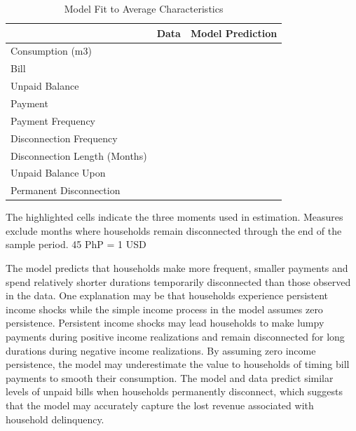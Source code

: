 \documentclass[12pt,table]{article}
\begin{document}
\begin{table}[H]
\centering
\caption{Model Fit to Average Characteristics}\label{table:fit}
\begin{threeparttable}
\begin{tabular}{@{}l*{1}{KK}@{}}
\toprule
 & Data & Model Prediction \\
\midrule
Consumption (m3) &  &   \\
Bill &   &   \\
Unpaid Balance &    &    \\
Payment &   &   \\
Payment Frequency &   &    \\
Disconnection Frequency &    &   \\
Disconnection Length (Months) &  &   \\
Unpaid Balance Upon &   &    \\[-.5em]
Permanent Disconnection \\
\bottomrule
\end{tabular}
\begin{tablenotes}
\item 
\footnotesize
The highlighted cells indicate the three moments used in estimation.  Measures exclude months where households remain disconnected through the end of the sample period.    45 PhP = 1 USD
\end{tablenotes}
\end{threeparttable}

\end{table}


The model predicts that households make more frequent, smaller payments and spend relatively shorter durations temporarily disconnected than those observed in the data.  One explanation may be that households experience persistent income shocks while the simple income process in the model assumes zero persistence.  Persistent income shocks may lead households to make lumpy payments during positive income realizations and remain disconnected for long durations during negative income realizations.  By assuming zero income persistence, the model may underestimate the value to households of timing bill payments to smooth their consumption.  The model and data predict similar levels of unpaid bills when households permanently disconnect, which suggests that the model may accurately capture the lost revenue associated with household delinquency.  
\end{document}
